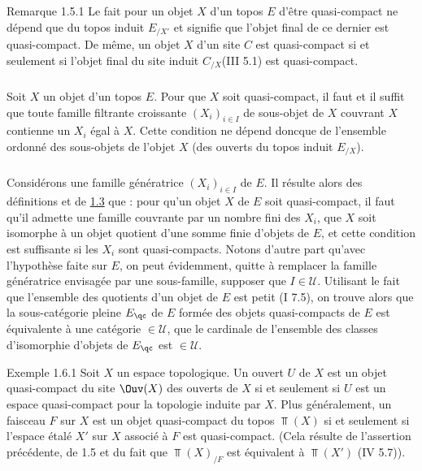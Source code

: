\begin{enonce*}[remark]{Remarque 1.5.1}
Le fait pour un objet $X$ d'un topos $E$ d'être quasi-compact ne
dépend que du topos induit $E_{/X'}$ et signifie que l'objet final de
ce dernier est quasi-compact. De même, un objet $X$ d'un site $C$ est
quasi-compact si et seulement si l'objet final du site induit
$C_{/X}$(III 5.1) est quasi-compact.
\end{enonce*}

\setcounter{subsection}{5}
\setcounter{subsubsection}{1}
\subsubsection{}
Soit $X$ un objet d'un topos $E$. Pour que $X$ soit quasi-compact, il
faut et il suffit que toute famille filtrante croissante $(X_i)_{i \in
I}$ de sous-objet de $X$ couvrant $X$ contienne un $X_i$ égal à
$X$. Cette condition ne dépend donc\pageoriginale que de l'ensemble ordonné des
sous-objets de l'objet $X$ (\ie des ouverts du topos induit $E_{/X}$).

\subsubsection{}
Considérons une famille génératrice $(X_i)_{i \in I}$ de $E$. Il
résulte alors des définitions et de \hyperref[VI.prop1.3]{1.3} que : pour
qu'un objet $X$ de $E$ soit quasi-compact, il faut qu'il admette une
famille couvrante par un nombre fini des $X_i$, \ie que $X$ soit
isomorphe à un objet quotient d'une somme finie d'objets de $E$, et
cette condition est suffisante si les $X_i$ sont quasi-compacts.
Notons d'autre part qu'avec l'hypothèse faite sur $E$, on peut
évidemment, quitte à remplacer la famille génératrice envisagée par
une sous-famille, supposer que $I \in 𝒰$. Utilisant le fait
que l'ensemble des quotients d'un objet de $E$ est petit (I 7.5), on
trouve alors que la sous-catégorie pleine $E_{\qc}$ de $E$ formée
des objets quasi-compacts de $E$ est équivalente à une catégorie
$\in 𝒰$, \ie que le cardinale de l'ensemble des classes
d'isomorphie d'objets de $E_{\qc}$ est $\in 𝒰$.

\begin{enonce*}[remark]{Exemple 1.6.1}
Soit $X$ un espace topologique. Un ouvert $U$ de $X$ est un objet
quasi-compact du site $\Ouv(X)$ des ouverts de $X$ si et seulement si
$U$ est un espace quasi-compact pour la topologie induite par
$X$. Plus généralement, un faisceau $F$ sur $X$ est un objet
quasi-compact du topos $\Top(X)$ si et seulement si l'espace étalé $X'$
sur $X$ associé à $F$ est quasi-compact. (Cela résulte de l'assertion
précédente, de 1.5 et du fait que $\Top (X)_{/F}$ est équivalent à
$\Top(X')$ (IV 5.7)).
\end{enonce*}

